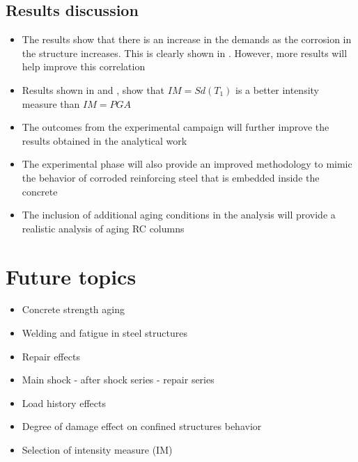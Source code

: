 \subsection{Results discussion}
\begin{itemize}
	\item The results show that there is an increase in the demands as the corrosion in the structure increases. This is clearly shown in . However, more results will help improve this correlation
	\item Results shown in  and , show that $IM=Sd(T_1)$ is a better intensity measure than $IM=PGA$
	\item The outcomes from the experimental campaign will further improve the results obtained in the analytical work
	\item The experimental phase will also provide an improved methodology to mimic the behavior of corroded reinforcing steel that is embedded inside the concrete
	\item The inclusion of additional aging conditions in the analysis will provide a realistic analysis of aging RC columns
\end{itemize}

\section{Future topics}

\begin{itemize}
	\item Concrete strength aging
	\item Welding and fatigue in steel structures
	\item Repair effects
	\item Main shock - after shock series - repair series
	\item Load history effects
	\item Degree of damage effect on confined structures behavior
	\item Selection of intensity measure (IM)
\end{itemize}
